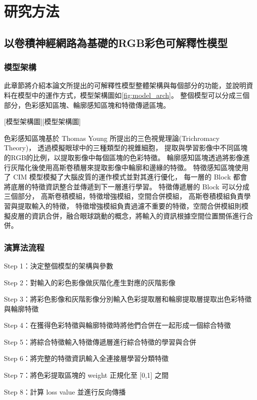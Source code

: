 \documentclass[class=NCU_thesis, crop=false]{standalone}
\begin{document}
\chapter{研究方法}

\section{以卷積神經網路為基礎的RGB彩色可解釋性模型}
\subsection{模型架構}

此章節將介紹本論文所提出的可解釋性模型整體架構與每個部分的功能，並說明資料在模型中的運作方式，模型架構圖如\cref{fig:model_arch}。
整個模型可以分成三個部分，色彩感知區塊、輪廓感知區塊和特徵傳遞區塊。

[模型架構圖][模型架構圖]


色彩感知區塊基於 Thomas Young 所提出的三色視覺理論(Trichromacy Theory)\cite{}，
透過模擬眼球中的三種類型的視錐細胞，
提取與學習影像中不同區塊的RGB的比例，以提取影像中每個區塊的色彩特徵。
輪廓感知區塊透過將影像進行灰階化後使用高斯卷積層來提取影像中輪廓和邊緣的特徵。
特徵感知區塊使用了 CIM 模型模擬了大腦皮質的運作模式並對其進行優化，
每一層的 Block 都會將底層的特徵資訊整合並傳遞到下一層進行學習。 
特徵傳遞層的 Block 可以分成三個部分，
高斯卷積模組，特徵增強模組，空間合併模組，
高斯卷積模組負責學習與提取輸入的特徵，
特徵增強模組負責過濾不重要的特徵，空間合併模組則模擬皮層的資訊合併，融合眼球跳動的概念，將輸入的資訊根據空間位置關係進行合併。


\subsection{演算法流程}
Step 1：決定整個模型的架構與參數

Step 2：對輸入的彩色影像做灰階化產生對應的灰階影像

Step 3：將彩色影像和灰階影像分別輸入色彩提取層和輪廓提取層提取出色彩特徵與輪廓特徵

Step 4：在獲得色彩特徵與輪廓特徵時將他們合併在一起形成一個綜合特徵

Step 5：將綜合特徵輸入特徵傳遞層進行綜合特徵的學習與合併

Step 6：將完整的特徵資訊輸入全連接層學習分類特徵

Step 7：將色彩提取區塊的 weight 正規化至 [0,1] 之間

Step 8：計算 loss value 並進行反向傳播
\end{document}
